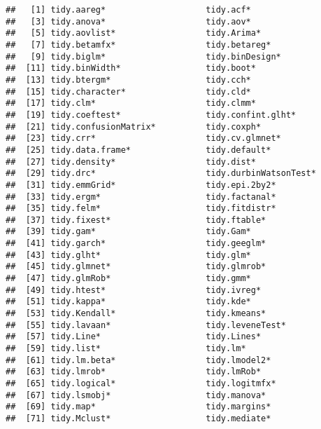 \documentclass[
]{book}
\begin{document}
\begin{verbatim}
##   [1] tidy.aareg*                    tidy.acf*                     
##   [3] tidy.anova*                    tidy.aov*                     
##   [5] tidy.aovlist*                  tidy.Arima*                   
##   [7] tidy.betamfx*                  tidy.betareg*                 
##   [9] tidy.biglm*                    tidy.binDesign*               
##  [11] tidy.binWidth*                 tidy.boot*                    
##  [13] tidy.btergm*                   tidy.cch*                     
##  [15] tidy.character*                tidy.cld*                     
##  [17] tidy.clm*                      tidy.clmm*                    
##  [19] tidy.coeftest*                 tidy.confint.glht*            
##  [21] tidy.confusionMatrix*          tidy.coxph*                   
##  [23] tidy.crr*                      tidy.cv.glmnet*               
##  [25] tidy.data.frame*               tidy.default*                 
##  [27] tidy.density*                  tidy.dist*                    
##  [29] tidy.drc*                      tidy.durbinWatsonTest*        
##  [31] tidy.emmGrid*                  tidy.epi.2by2*                
##  [33] tidy.ergm*                     tidy.factanal*                
##  [35] tidy.felm*                     tidy.fitdistr*                
##  [37] tidy.fixest*                   tidy.ftable*                  
##  [39] tidy.gam*                      tidy.Gam*                     
##  [41] tidy.garch*                    tidy.geeglm*                  
##  [43] tidy.glht*                     tidy.glm*                     
##  [45] tidy.glmnet*                   tidy.glmrob*                  
##  [47] tidy.glmRob*                   tidy.gmm*                     
##  [49] tidy.htest*                    tidy.ivreg*                   
##  [51] tidy.kappa*                    tidy.kde*                     
##  [53] tidy.Kendall*                  tidy.kmeans*                  
##  [55] tidy.lavaan*                   tidy.leveneTest*              
##  [57] tidy.Line*                     tidy.Lines*                   
##  [59] tidy.list*                     tidy.lm*                      
##  [61] tidy.lm.beta*                  tidy.lmodel2*                 
##  [63] tidy.lmrob*                    tidy.lmRob*                   
##  [65] tidy.logical*                  tidy.logitmfx*                
##  [67] tidy.lsmobj*                   tidy.manova*                  
##  [69] tidy.map*                      tidy.margins*                 
##  [71] tidy.Mclust*                   tidy.mediate*                 

\end{verbatim}
\end{document}
